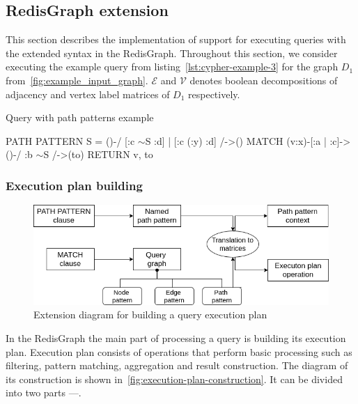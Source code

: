 \subsection{RedisGraph extension}
This section describes the implementation of support for executing queries with the extended syntax in the RedisGraph. Throughout this section, we consider executing the example query from listing~\autoref{lst:cypher-example-3} for the graph $D_1$ from~\autoref{fig:example_input_graph}. $\mathcal{E}$ and $\mathcal{V}$ denotes boolean decompositions of adjacency and vertex label matrices of $D_1$ respectively. 

\begin{algorithm}
\begin{algorithmic}[1]
\caption{Query with path patterns example}
\label{lst:cypher-example-3}
\State PATH PATTERN S = ()-/ [:c $\sim$S :d] | [:c (:y) :d] /->()
\State MATCH (v:x)-[:a | :c]->()-/ :b $\sim$S /->(to)
\State RETURN v, to
\end{algorithmic}
\end{algorithm}

\subsubsection{Execution plan building}
\begin{figure}[h]
  \centering
  \includegraphics[width=\linewidth]{execution-plan-building.png}
  \caption{Extension diagram for building a query execution plan}
  \label{fig:execution-plan-construction}
\end{figure}

In the RedisGraph the main part of processing a query is building its execution plan. Execution plan consists of operations that perform basic processing such as filtering, pattern matching, aggregation and result construction. The diagram of its construction is shown in~\autoref{fig:execution-plan-construction}. It can be divided into two parts ---.

